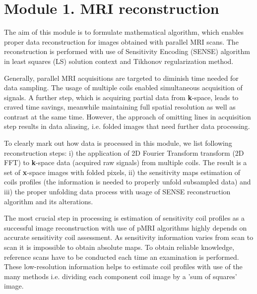 \section{Module 1. MRI reconstruction}

The aim of this module is to formulate mathematical algorithm, which
enables proper data reconstruction for images obtained with parallel
MRI scans. The reconstruction is performed with use of Sensitivity
Encoding (SENSE) algorithm in least squares (LS) solution context
and Tikhonov regularization method.

Generally, parallel MRI acquisitions are targeted to diminish time
needed for data sampling. The usage of multiple coils enabled simultaneous
acquisition of signals. A further step, which is acquiring partial
data from \textbf{k}-space, leads to craved time savings, meanwhile
maintaining full spatial resolution as well as contrast at the same
time. However, the approach of omitting lines in acquisition step
results in data aliasing, i.e. folded images that need further data
processing.

To clearly mark out how data is processed in this module, we list
following reconstruction steps: i) the application of 2D Fourier Transform
transform (2D FFT) to \textbf{k}-space data (acquired raw signals)
from multiple coils. The result is a set of \textbf{x}-space images
with folded pixels, ii) the sensitivity maps estimation of coils profiles
(the information is needed to properly unfold subsampled data) and
iii) the proper unfolding data process with usage of SENSE reconstruction
algorithm and its alterations.

The most crucial step in processing is estimation of sensitivity coil
profiles as a successful image reconstruction with use of pMRI algorithms
highly depends on accurate sensitivity coil assessment. As sensitivity
information varies from scan to scan it is impossible to obtain absolute
maps. To obtain reliable knowledge, reference scans have to be conducted
each time an examination is performed. These low-resolution information
helps to estimate coil profiles with use of the many methods i.e.
dividing each component coil image by a 'sum of squares' image.

